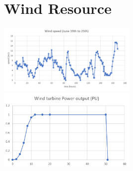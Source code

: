 \documentclass[journal]{IEEEtran}
\begin{document}
        \section{Wind Resource}
        \includegraphics[width=0.5\textwidth]{fig/windspeed.png}
        \includegraphics[width=0.5\textwidth]{fig/turbineresp.png}
        \label{ap:wind}

        \newpage
\end{document}
